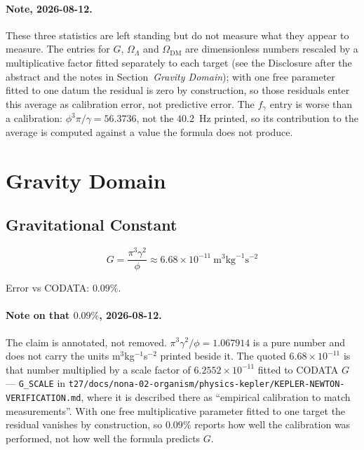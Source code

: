 \documentclass[12pt,a4paper]{article}
\begin{document}
\paragraph{Note, 2026-08-12.} These three statistics are left standing but do not measure what they appear to measure. The entries for $G$, $\Omega_\Lambda$ and $\Omega_{\mathrm{DM}}$ are dimensionless numbers rescaled by a multiplicative factor fitted separately to each target (see the Disclosure after the abstract and the notes in Section~\emph{Gravity Domain}); with one free parameter fitted to one datum the residual is zero by construction, so those residuals enter this average as calibration error, not predictive error. The $f_\gamma$ entry is worse than a calibration: $\phi^3\pi/\gamma = 56.3736$, not the $40.2$~Hz printed, so its contribution to the average is computed against a value the formula does not produce.

\section{Gravity Domain}

\subsection{Gravitational Constant}

\begin{equation}
G = \frac{\pi^3 \gamma^2}{\phi} \approx 6.68 \times 10^{-11}~\text{m}^3\text{kg}^{-1}\text{s}^{-2}
\end{equation}

Error vs CODATA: $0.09\%$.

\paragraph{Note on that $0.09\%$, 2026-08-12.} The claim is annotated, not removed. $\pi^3\gamma^2/\phi = 1.067914$ is a pure number and does not carry the units m$^3$kg$^{-1}$s$^{-2}$ printed beside it. The quoted $6.68\times10^{-11}$ is that number multiplied by a scale factor of $6.2552\times10^{-11}$ fitted to CODATA $G$ --- \texttt{G\_SCALE} in \texttt{t27/docs/nona-02-organism/physics-kepler/KEPLER-NEWTON-VERIFICATION.md}, where it is described there as ``empirical calibration to match measurements''. With one free multiplicative parameter fitted to one target the residual vanishes by construction, so $0.09\%$ reports how well the calibration was performed, not how well the formula predicts $G$.
\end{document}
